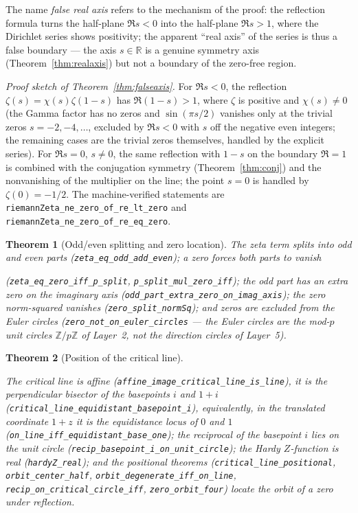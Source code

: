 \documentclass{article}
\newtheorem{theorem}{Theorem}[section]
\newcommand{\R}{\mathbb{R}}
\newcommand{\Z}{\mathbb{Z}}
\newcommand{\zt}{\zeta}
\newcommand{\Xchi}{\chi}
\begin{document}
The name \emph{false real axis} refers to the mechanism of the proof: the
reflection formula turns the half-plane $\Re s<0$ into the half-plane
$\Re s>1$, where the Dirichlet series shows positivity; the apparent ``real
axis'' of the series is thus a false boundary --- the axis $s\in\R$ is a
genuine symmetry axis (Theorem~\ref{thm:realaxis}) but not a boundary of the
zero-free region.

\emph{Proof sketch of Theorem~\ref{thm:falseaxis}.} For $\Re s<0$, the
reflection $\zt(s)=\Xchi(s)\zt(1-s)$ has $\Re(1-s)>1$, where $\zt$ is
positive and $\Xchi(s)\neq 0$ (the Gamma factor has no zeros and
$\sin(\pi s/2)$ vanishes only at the trivial zeros $s=-2,-4,\dots$, excluded
by $\Re s<0$ with $s$ off the negative even integers; the remaining cases
are the trivial zeros themselves, handled by the explicit series). For
$\Re s=0$, $s\neq 0$, the same reflection with $1-s$ on the boundary
$\Re=1$ is combined with the conjugation symmetry
(Theorem~\ref{thm:conj}) and the nonvanishing of the multiplier on the
line; the point $s=0$ is handled by $\zt(0)=-1/2$. The machine-verified
statements are \texttt{riemannZeta\_ne\_zero\_of\_re\_lt\_zero} and
\texttt{riemannZeta\_ne\_zero\_of\_re\_eq\_zero}.

\begin{theorem}[Odd/even splitting and zero location]
\label{thm:split}
The zeta term splits into odd and even parts
(\texttt{zeta\_eq\_odd\_add\_even}); a zero forces both parts to vanish
\begin{sloppypar}(\texttt{zeta\_eq\_zero\_iff\_p\_split}, \texttt{p\_split\_mul\_zero\_iff});
the odd part has an extra zero on the imaginary axis
(\texttt{odd\_part\_extra\_zero\_on\_imag\_axis}); the zero norm-squared
vanishes (\texttt{zero\_split\_normSq}); and zeros are excluded from the
Euler circles (\texttt{zero\_not\_on\_euler\_circles} --- the Euler
circles are the mod-$p$ unit circles $\Z/p\Z$ of Layer~2, not the
direction circles of Layer~5).\end{sloppypar}
\end{theorem}

\begin{theorem}[Position of the critical line]
\label{thm:position}
\begin{sloppypar}The critical line is affine
(\texttt{affine\_image\_critical\_line\_is\_line}),
it is the perpendicular bisector of the basepoints $i$ and $1+i$
(\texttt{critical\_line\_equidistant\_basepoint\_i}), equivalently, in the
translated coordinate $1+z$ it is the equidistance locus of $0$ and $1$
(\texttt{on\_line\_iff\_equidistant\_base\_one}); the reciprocal of the
basepoint $i$ lies on the unit circle
(\texttt{recip\_basepoint\_i\_on\_unit\_circle}); the Hardy $Z$-function is
real (\texttt{hardyZ\_real}); and the positional theorems
(\texttt{critical\_line\_positional}, \texttt{orbit\_center\_half},
\texttt{orbit\_degenerate\_iff\_on\_line},
\texttt{recip\_on\_critical\_circle\_iff}, \texttt{zero\_orbit\_four})
locate the orbit of a zero under reflection.\end{sloppypar}
\end{theorem}
\end{document}
